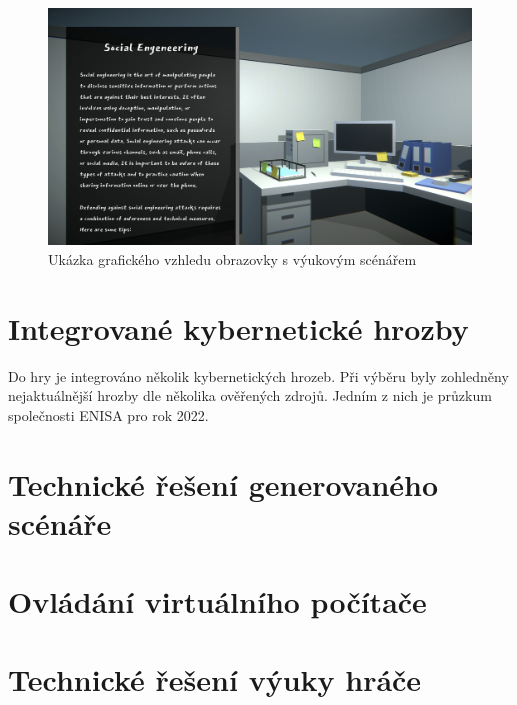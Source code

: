 \documentclass[12pt, a4paper,
 oneside,   
 openright
]{report}
\begin{document}



\begin{figure}[ht]
    \includegraphics[width=\columnwidth]{uceni0.png}
    \centering
    \caption{Ukázka grafického vzhledu obrazovky s výukovým scénářem}
    \label{fig:uceni0_img}
\end{figure}


\section{Integrované kybernetické hrozby}
Do hry je integrováno několik kybernetických hrozeb. Při výběru byly zohledněny nejaktuálnější hrozby dle několika ověřených zdrojů. Jedním z nich je průzkum společnosti ENISA pro rok 2022. \cite{enisa}




\section[Řešení generovaného scénáře]{Technické řešení generovaného scénáře}




\section{Ovládání virtuálního počítače}


\section[Řešení výukového scénáře]{Technické řešení výuky hráče}

\end{document}
